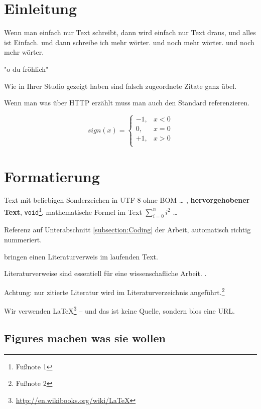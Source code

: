 \section{Einleitung}
\label{section:Introduction}

Wenn man einfach nur Text schreibt, dann wird
einfach nur Text draus, und alles ist Einfach.
und dann schreibe ich mehr wörter.
und noch mehr wörter. und noch mehr wörter.

"o du fröhlich"

Wie \textcite[]{Mulloni:2010} in Ihrer Studio gezeigt haben sind falsch zugeordnete Zitate  ganz übel.

Wenn man was über HTTP erzählt muss man auch den
Standard referenzieren.\autocite[]{RFC2616}


$$
sign(x)=
\begin{cases}
        -1, & x < 0 \\
        0, & x = 0 \\
        +1, & x > 0 \\
\end{cases}
$$


\section{Formatierung}
\label{section:Formatting}


Text mit beliebigen Sonderzeichen in UTF-8 ohne BOM \ldots
,
\textbf{hervorgehobener Text},
\texttt{void}\footnote{Fußnote 1},
mathematische Formel im Text $\sum_{i=0}^n i^2$
\ldots

Referenz auf Unterabschnitt \ref{subsection:Coding} der Arbeit, automatisch richtig nummeriert.

\textcite[]{Mulloni:2010} bringen einen Literaturverweis im laufenden Text.

Literaturverweise sind essentiell für eine wissenschafliche Arbeit. \autocite[]{McConnell:2004:CCS:1096143}.

Achtung: nur zitierte Literatur wird im Literaturverzeichnis
angeführt.\footnote{Fußnote 2}


Wir verwenden \LaTeX\footnote{ \url{http://en.wikibooks.org/wiki/LaTeX}} -- und das
ist keine Quelle, sondern blos eine URL.

\subsection{Figures machen was sie wollen}

